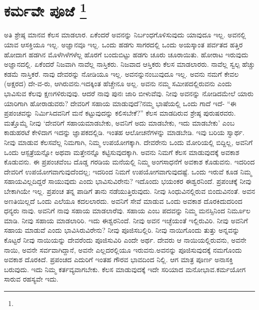 
\vspace{-1.2cm}

\chapter[ಕರ್ಮವೇ ಪೂಜೆ ]{ಕರ್ಮವೇ ಪೂಜೆ \protect\footnote{}}

ಅತಿ ಶ್ರೇಷ್ಠ ಮಾನವ ಕೆಲಸ ಮಾಡಲಾರ. ಏಕೆಂದರೆ ಅವನನ್ನು ನಿರ್ಬಂಧಗೊಳಿಸುವುದು ಯಾವುದೂ ಇಲ್ಲ. ಅವನಲ್ಲಿ ಯಾವ ಆಸಕ್ತಿಯೂ ಇಲ್ಲ. ಅಜ್ಞಾನವೂ ಇಲ್ಲ. ಒಂದು ಹಡಗು ಸಾಗರದಲ್ಲಿ ಒಂದು ಅಯಸ್ಕಾಂತ ಪರ್ವತದ ಹತ್ತಿರ ಹೋದಾಗ ಹಡಗಿನ ಮೊಳೆಗಿಳೆಗಳೆಲ್ಲ ಹೊರಗೆ ಬಂದುಬಿಟ್ಟು ಹಡಗು ಚೂರು ಚೂರಾಯಿತು. ಹೋರಾಟ ಇರುವುದು ಅಜ್ಞಾನದಲ್ಲಿ. ಏಕೆಂದರೆ ನಿಜವಾಗಿ ನಾವೆಲ್ಲ ನಾಸ್ತಿಕರು. ನಿಜವಾದ ಆಸ್ತಿಕರು ಕೆಲಸ ಮಾಡಲಾರರು. ನಾವೆಲ್ಲ ಸ್ವಲ್ಪ ಹೆಚ್ಚು ಕಡಮೆ ನಾಸ್ತಿಕರೆ. ನಾವು ದೇವರನ್ನು ನೋಡಿಯೂ ಇಲ್ಲ. ಅವನನ್ನು\break ನಂಬುವುದೂ ಇಲ್ಲ. ಅವನು ನಮಗೆ ಕೇವಲ (ಅಕ್ಷರದ) ದೇ-ವ-ರು, ಆಗಿರುವನು.\break ಇದಕ್ಕಿಂತ ಹೆಚ್ಚೇನೂ ಅಲ್ಲ. ಅವನು ನಮ್ಮ ಸಮೀಪದಲ್ಲಿರುವನು ಎಂದು ಭಾವಿಸುವ ಕೆಲವು ಕ್ಷಣಗಳಿರುವುವು. ಆದರೆ ನಾವು ಪುನಃ ಜಾರಿ ಬೀಳುವೆವು. ನೀವು ಅವನನ್ನು ನೋಡಿದ\break ಮೇಲೆ ಯಾರು ಯಾರಿಗಾಗಿ ಹೋರಾಡುವರು? ದೇವರಿಗೆ ಸಹಾಯ ಮಾಡುವುದೆ?\break ನಮ್ಮ ಭಾಷೆಯಲ್ಲಿ ಒಂದು ಗಾದೆ ಇದೆ- “ಈ ಪ್ರಪಂಚವನ್ನು ನಿರ್ಮಿಸಿದವನಿಗೆ ಮನೆ ಕಟ್ಟುವುದನ್ನು ಕಲಿಸಬೇಕೆ?” ಕೆಲಸ ಮಾಡದಿರುವ ಶ್ರೇಷ್ಠ ಪುರುಷರವರು. ಮತ್ತೊಮ್ಮೆ ನೀವು ‘ದೇವರಿಗೆ ಸಹಾಯಮಾಡಬೇಕು, ಅವನಿಗೆ ಅದು ಮಾಡಬೇಕು, ಇದು ಮಾಡಬೇಕು’ ಎಂಬ ಕಾಡುಹರಟೆ ಕೇಳಿದಾಗ ಇದನ್ನು ಜ್ಞಾಪಕದಲ್ಲಿಡಿ. ಇಂತಹ ಆಲೋಚನೆಗಳನ್ನು ಮಾಡಬೇಡಿ. ಇವು ಬರಿಯ ಸ್ವಾರ್ಥ. ನೀವು ಮಾಡುವ ಕೆಲಸವೆಲ್ಲ ನಿಮಗಾಗಿ, ನಿಮ್ಮ ಉಪಯೋಗಕ್ಕಾಗಿ. ದೇವರೇನು ಒಂದು ಮೋರಿಯಲ್ಲಿ ಬಿದ್ದಿಲ್ಲ, ಅವನಿಗೆ ಒಂದು ಆಸ್ಪತ್ರೆಯನ್ನೋ ಅಥವಾ ಮತ್ತೇನನ್ನೊ ಕಟ್ಟಿಸುವುದಕ್ಕಾಗಿ. ಅವನು ನಿಮಗೆ ಕೆಲಸ ಮಾಡುವುದಕ್ಕೆ ಅವಕಾಶ ಕೊಡುವನು. ಈ ಪ್ರಪಂಚವೆಂಬ ದೊಡ್ಡ ಗರಡಿಯ ಮನೆಯಲ್ಲಿ ನಿಮ್ಮ ಅಂಗಸಾಧನೆಗೆ ಅವಕಾಶ ಕೊಡುವನು. ಇದರಿಂದ ದೇವರಿಗೆ ಉಪಯೋಗವಾಗುವುದೆಂದಲ್ಲ; ಇದರಿಂದ ನಿಮಗೆ ಉಪಯೋಗವಾಗುವುದಷ್ಟೆ. ಒಂದು ಇರುವೆ ಕೂಡ ನಿಮ್ಮ ಸಹಾಯವಿಲ್ಲದಿದ್ದರೆ ಸಾಯುವುದು ಎಂದು ಭಾವಿಸುವಿರೇನು? ಇದೊಂದು ಭಯಂಕರ ಈಶ್ವರನಿಂದೆ. ಪ್ರಪಂಚಕ್ಕೆ ನೀವು ಬೇಕಾಗಿಯೇ ಇಲ್ಲ. ಪ್ರಪಂಚ ತನ್ನ ಪಾಡಿಗೆ ತಾನು ನಡೆಯುತ್ತಿರುವುದು. ನೀವು ಸಿಂಧುವಿನಲ್ಲಿರುವ ಬಿಂದುವಿನಂತೆ. ಅವನ ಅಣತಿಯಿಲ್ಲದೆ ಒಂದು ಎಲೆಯೂ ಕದಲಲಾರದು. ಅವನಿಗೆ ಸೇವೆ ಮಾಡುವ ಒಂದು ಅವಕಾಶ ದೊರಕಿದುದರಿಂದ ಧನ್ಯರು ನಾವು. ಅವನಿಗೆ ನಾವು ಸಹಾಯ ಮಾಡಲಾರೆವು. ಸಹಾಯ ಎಂಬ ಪದವನ್ನು ನಿಮ್ಮ ಮನಸ್ಸಿನಿಂದ ನಿರ್ಮೂಲ ಮಾಡಿ. ನೀವು ಸಹಾಯ ಮಾಡಲಾರಿರಿ. ಇದು ಈಶ್ವರನಿಂದೆ. ನೀವು ಅವನ ಇಚ್ಛೆಯಂತೆ ಇಲ್ಲಿರುವಿರಿ. ನೀವು ಅವನಿಗೆ ಸಹಾಯ ಮಾಡುವೆ ಎಂದು ಭಾವಿಸಿರುವಿರೇನು? ನೀವು ಪೂಜಿಸಬಲ್ಲಿರಿ. ನೀವು ನಾಯಿಗೊಂದು ತುತ್ತು ಅನ್ನವನ್ನು ಕೊಟ್ಟರೆ ನೀವು ನಾಯಿಯನ್ನು ದೇವರೆಂದು ಪೂಜಿಸುವಿರಿ ಎಂದೇ ಅರ್ಥ. ದೇವರು ಆ ನಾಯಿಯಲ್ಲಿರುವನು, ಅವನೇ ನಾಯಿ, ಅವನೇ ಸರ್ವವಾಗಿದ್ದಾನೆ, ಅವನೇ ಎಲ್ಲದರಲ್ಲಿಯೂ ಇರುವನು.\break ಅವನನ್ನು ಪೂಜಿಸುವುದಕ್ಕೆ ನಮಗೊಂದು ಅವಕಾಶ ದೊರಕಿದೆ. ಪ್ರಪಂಚದ ಎದುರಿಗೆ ಇಂತಹ ಗೌರವ ಭಾವದಿಂದ ನಿಲ್ಲಿ. ಆಗ ಮಾತ್ರ ಪೂರ್ಣ ಅನಾಸಕ್ತಿ ಬರುವುದು. ಇದು ನಿಮ್ಮ ಕರ್ತವ್ಯವಾಗಬೇಕು. ಕೆಲಸ ಮಾಡುವುದಕ್ಕೆ ಇದೇ ಸರಿಯಾದ ಮನೋಭಾವ.\break ಕರ್ಮಯೋಗ ಸಾರುವ ರಹಸ್ಯವೇ ಇದು.

